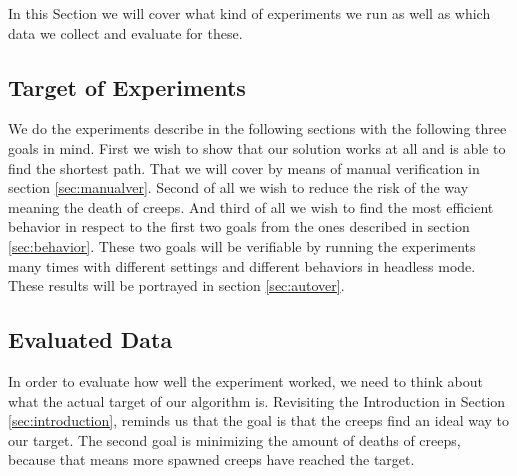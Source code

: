 In this Section we will cover what kind of experiments we run as well as which data we collect and evaluate for these.

\subsection{Target of Experiments}
We do the experiments describe in the following sections with the following three goals in mind.
First we wish to show that our solution works at all and is able to find the shortest path. That we will cover by means of manual verification in section \ref{sec:manualver}.
Second of all we wish to reduce the risk of the way meaning the death of creeps. And third of all we wish to find the most efficient behavior in respect to the first two goals from the ones described in section \ref{sec:behavior}. These two goals will be verifiable by running the experiments many times with different settings and different behaviors in headless mode. These results will be portrayed in section \ref{sec:autover}.

\subsection{Evaluated Data}
\label{sec:experimentevdata}

In order to evaluate how well the experiment worked, we need to think about what the actual target of our algorithm is. Revisiting the Introduction in Section \ref{sec:introduction}, reminds us that the goal is that the creeps find an ideal way to our target. The second goal is minimizing the amount of deaths of creeps, because that means more spawned creeps have reached the target.


